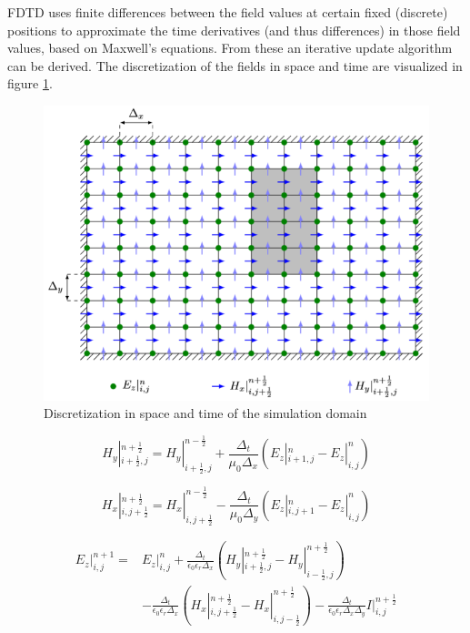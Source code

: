 \documentclass[11pt, a4paper]{article}
\begin{document}
FDTD uses finite differences between the field values at certain fixed (discrete) positions to approximate the time derivatives (and thus differences) in those field values, based on Maxwell's equations. From these an iterative update algorithm can be derived. The discretization of the fields in space and time are visualized in figure \ref{Discretization}.

\begin{figure}[H]
\centering
\includegraphics[width=0.6\linewidth]{Discretrization.PNG}
\caption{Discretization in space and time of the simulation domain}
\label{Discretization}
\end{figure}

\begin{equation}
    H_y|_{i+\frac{1}{2},j}^{n+\frac{1}{2}} = H_y|_{i+\frac{1}{2},j}^{n-\frac{1}{2}} + \frac{\Delta_t}{\mu_0 \Delta_x} \left( E_z|_{i+1,j}^{n} - E_z|_{i,j}^{n} \right)
\end{equation}

\begin{equation}
    H_x|_{i,j+\frac{1}{2}}^{n+\frac{1}{2}} = H_x|_{i,j+\frac{1}{2}}^{n-\frac{1}{2}} - \frac{\Delta_t}{\mu_0 \Delta_y} \left( E_z|_{i,j+1}^{n} - E_z|_{i,j}^{n} \right)
\end{equation}

\begin{equation}
\begin{split}
    E_z|_{i,j}^{n+1} = & E_z|_{i,j}^{n} + \frac{\Delta_t}{\epsilon_0 \epsilon_r \Delta_x} \left( H_y|_{i+\frac{1}{2},j}^{n+\frac{1}{2}} - H_y|_{i-\frac{1}{2},j}^{n+\frac{1}{2}} \right) \\
    & - \frac{\Delta_t}{\epsilon_0 \epsilon_r \Delta_x} \left( H_x|_{i,j+\frac{1}{2}}^{n+\frac{1}{2}} - H_x|_{i,j-\frac{1}{2}}^{n+\frac{1}{2}} \right) - \frac{\Delta_t}{\epsilon_0 \epsilon_r \Delta_x \Delta_y} I|_{i,j}^{n+\frac{1}{2}}
\end{split}
\end{equation}
\end{document}
